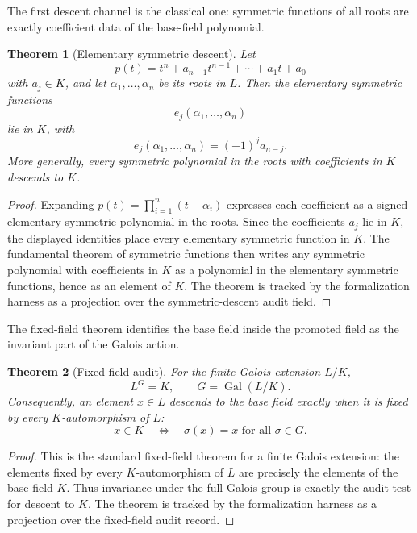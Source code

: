 \documentclass[11pt]{article}
\newcommand{\Gal}{\operatorname{Gal}}
\newtheorem{theorem}{Theorem}[section]
\theoremstyle{definition}
\begin{document}
The first descent channel is the classical one: symmetric functions of all roots
are exactly coefficient data of the base-field polynomial.

\begin{theorem}[Elementary symmetric descent]
\label{thm:gal-symmetric-descent}
Let
\[
p(t)=t^n+a_{n-1}t^{n-1}+\cdots+a_1t+a_0
\]
with \(a_j\in K\), and let \(\alpha_1,\ldots,\alpha_n\) be its roots in \(L\).  Then the elementary symmetric functions
\[
e_j(\alpha_1,\ldots,\alpha_n)
\]
lie in \(K\), with
\[
e_j(\alpha_1,\ldots,\alpha_n)=(-1)^j a_{n-j}.
\]
More generally, every symmetric polynomial in the roots with coefficients in \(K\) descends to \(K\).
\end{theorem}

\begin{proof}
Expanding \(p(t)=\prod_{i=1}^n(t-\alpha_i)\) expresses each coefficient as a
signed elementary symmetric polynomial in the roots.  Since the coefficients
\(a_j\) lie in \(K\), the displayed identities place every elementary symmetric
function in \(K\).  The fundamental theorem of symmetric functions then writes
any symmetric polynomial with coefficients in \(K\) as a polynomial in the
elementary symmetric functions, hence as an element of \(K\).  The theorem is
tracked by the formalization harness as a projection over the symmetric-descent
audit field.
\end{proof}

The fixed-field theorem identifies the base field inside the promoted field as
the invariant part of the Galois action.

\begin{theorem}[Fixed-field audit]
\label{thm:gal-fixed-field-audit}
For the finite Galois extension \(L/K\),
\[
L^G=K,
\qquad
G=\Gal(L/K).
\]
Consequently, an element \(x\in L\) descends to the base field exactly when it is fixed by every \(K\)-automorphism of \(L\):
\[
x\in K
\quad\Longleftrightarrow\quad
\sigma(x)=x\text{ for all }\sigma\in G.
\]
\end{theorem}

\begin{proof}
This is the standard fixed-field theorem for a finite Galois extension: the
elements fixed by every \(K\)-automorphism of \(L\) are precisely the elements of
the base field \(K\).  Thus invariance under the full Galois group is exactly the
audit test for descent to \(K\).  The theorem is tracked by the formalization
harness as a projection over the fixed-field audit record.
\end{proof}
\end{document}
